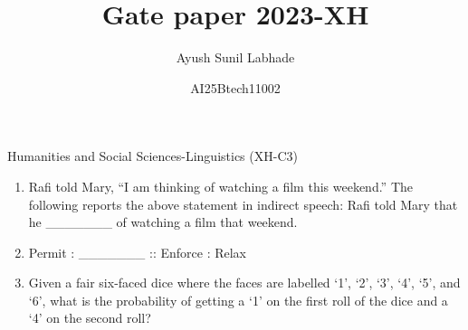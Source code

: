 \documentclass[12pt]{article}
\theoremstyle{remark}
\begin{document}
\title{\vspace{-5cm}Gate paper 2023-XH}
\author{Ayush Sunil Labhade}
\date{AI25Btech11002}
\maketitle

\begin{flushright}Humanities and Social Sciences-Linguistics (XH-C3)\end{flushright}
\begin{enumerate}
\item Rafi told Mary, “I am thinking of watching a film this weekend.”
The following reports the above statement in indirect speech:
Rafi told Mary that he \_\_\_\_\_\_\_ of watching a film that weekend.
\begin{enumerate}  \end{enumerate}
\hfill{}
\item Permit : \_\_\_\_\_\_\_ :: Enforce : Relax
\newline
\begin{enumerate}  \end{enumerate}
\hfill{}
\item Given a fair six-faced dice where the faces are labelled ‘1’, ‘2’, ‘3’, ‘4’, ‘5’, and ‘6’, what is the probability of getting a ‘1’ on the first roll of the dice and a ‘4’ on the second roll?
\begin{enumerate} 
\end{enumerate}
\end{enumerate}
\end{document}
